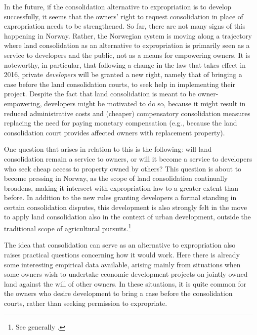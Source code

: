 In the future, if the consolidation alternative to expropriation is to develop successfully, it seems that the owners' right to request consolidation in place of expropriation needs to be strengthened. So far, there are not many signs of this happening in Norway. Rather, the Norwegian system is moving along a trajectory where land consolidation as an alternative to expropriation is primarily seen as a service to developers and the public, not as a means for empowering owners. It is noteworthy, in particular, that following a change in the law that takes effect in 2016, private {\it developers} will be granted a new right, namely that of bringing a case before the land consolidation courts, to seek help in implementing their project. Despite  the fact that land consolidation is meant to be owner-empowering, developers might be motivated to do so, because it might result in reduced administrative costs and (cheaper) compensatory consolidation measures replacing the need for paying monetary compensation (e.g., because the land consolidation court provides affected owners with replacement property).

One question that arises in relation to this is the following: will land consolidation remain a service to owners, or will it become a service to developers who seek cheap access to property owned by others? This question is about to become pressing in Norway, as the scope of land consolidation continually broadens, making it intersect with expropriation law to a greater extent than before. In addition to the new rules granting developers a formal standing in certain consolidation disputes, this development is also strongly felt in the move to apply land consolidation also in the context of urban development, outside the traditional scope of agricultural pursuits.\footnote{See generally \cite{stenseth07}.}


The idea that consolidation can serve as an alternative to expropriation also raises practical questions concerning how it would work. Here there is already some interesting empirical data available, arising mainly from situations when some owners wish to undertake economic development projects on jointly owned land against the will of other owners. In these situations, it is quite common for the owners who desire development to bring a case before the consolidation courts, rather than seeking permission to expropriate.

